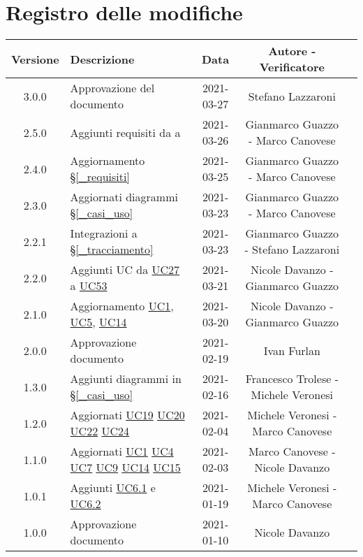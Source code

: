 \section*{Registro delle modifiche}

\begin{center}
	\begin{longtable}{|c|p{5cm}|c|c|c|}
	\hline
	\rowcolor{lighter-grayer}
	\textbf{Versione} & \textbf{Descrizione} & \textbf{Data} & \textbf{Autore - Verificatore} \\
	\hline
	\endfirsthead

	\hline
	3.0.0 & Approvazione del documento & 2021-03-27 & Stefano Lazzaroni \\
	2.5.0 & Aggiunti requisiti da {F}{29} a {F}{43} & 2021-03-26 & Gianmarco Guazzo - Marco Canovese\\
	2.4.0 & Aggiornamento \S\ref{_requisiti} & 2021-03-25 & Gianmarco Guazzo - Marco Canovese\\
	2.3.0 & Aggiornati diagrammi \S\ref{_casi_uso} & 2021-03-23 & Gianmarco Guazzo - Marco Canovese\\
	2.2.1 & Integrazioni a \S\ref{_tracciamento}  & 2021-03-23 & Gianmarco Guazzo - Stefano Lazzaroni\\
	2.2.0 & Aggiunti UC da \hyperref[UC27]{UC27} a \hyperref[UC53]{UC53} & 2021-03-21 &  Nicole Davanzo - Gianmarco Guazzo\\
	2.1.0 & Aggiornamento \hyperref[UC1]{UC1}, \hyperref[UC5]{UC5}, \hyperref[UC14]{UC14} & 2021-03-20 & Nicole Davanzo - Gianmarco Guazzo \\
	2.0.0 & Approvazione documento & 2021-02-19 & Ivan Furlan\\
	1.3.0 & Aggiunti diagrammi in \S\ref{_casi_uso} & 2021-02-16 & Francesco Trolese - Michele Veronesi \\
	1.2.0 & Aggiornati \hyperref[UC19]{UC19} \hyperref[UC20]{UC20} \hyperref[UC22]{UC22} \hyperref[UC24]{UC24} & 2021-02-04 & Michele Veronesi - Marco Canovese\\
	1.1.0 & Aggiornati \hyperref[UC1]{UC1} \hyperref[UC4]{UC4} \hyperref[UC7]{UC7} \hyperref[UC9]{UC9} \hyperref[UC14]{UC14} \hyperref[UC15]{UC15} & 2021-02-03 & Marco Canovese - Nicole Davanzo\\
	1.0.1 & Aggiunti \hyperref[UC6.1]{UC6.1} e \hyperref[UC6.2]{UC6.2} & 2021-01-19 & Michele Veronesi - Marco Canovese\\
	1.0.0 & Approvazione documento & 2021-01-10 & Nicole Davanzo\\

\end{longtable}
\end{center}
